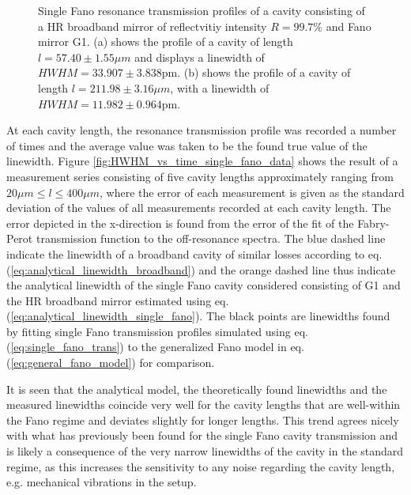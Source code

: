 \begin{figure}[h!]
\begin{subfigure}[b]{0.49\textwidth}
        \caption{}
        \label{fig:long_single_fano_trans}
    \end{subfigure}
    \caption{Single Fano resonance transmission profiles of a cavity consisting of a HR broadband mirror of reflectvitiy intensity $R=99.7\%$ and Fano mirror G1. (a) shows the profile of a cavity of length $l = 57.40 \pm 1.55 \mu m$ and displays a linewidth of $HWHM = 33.907 \pm 3.838$pm. (b) shows the profile of a cavity of length $l = 211.98 \pm 3.16 \mu m$, with a linewidth of $HWHM = 11.982 \pm 0.964$pm.}
    \label{fig:M5/G1_single_fano_trans_examples}
\end{figure}

At each cavity length, the resonance transmission profile was recorded a number of times and the average value was taken to be the found true value of the linewidth. Figure \ref{fig:HWHM_vs_time_single_fano_data} shows the result of a measurement series consisting of five cavity lengths approximately ranging from $20\mu m \leq l \leq 400 \mu m$, where the error of each measurement is given as the standard deviation of the values of all measurements recorded at each cavity length\cite{Hughes}. The error depicted in the x-direction is found from the error of the fit of the Fabry-Perot transmission function to the off-resonance spectra. The blue dashed line indicate the linewidth of a broadband cavity of similar losses according to eq. (\ref{eq:analytical_linewidth_broadband}) and the orange dashed line thus indicate the analytical linewidth of the single Fano cavity considered consisting of G1 and the HR broadband mirror estimated using eq. (\ref{eq:analytical_linewidth_single_fano}). The black points are linewidths found by fitting single Fano transmission profiles simulated using eq. (\ref{eq:single_fano_trans}) to the generalized Fano model in eq. (\ref{eq:general_fano_model}) for comparison. 

It is seen that the analytical model, the theoretically found linewidths and the measured linewidths coincide very well for the cavity lengths that are well-within the Fano regime and deviates slightly for longer lengths. This trend agrees nicely with what has previously been found for the single Fano cavity transmission\cite{Mitra} and is likely a consequence of the very narrow linewidths of the cavity in the standard regime, as this increases the sensitivity to any noise regarding the cavity length, e.g. mechanical vibrations in the setup.

